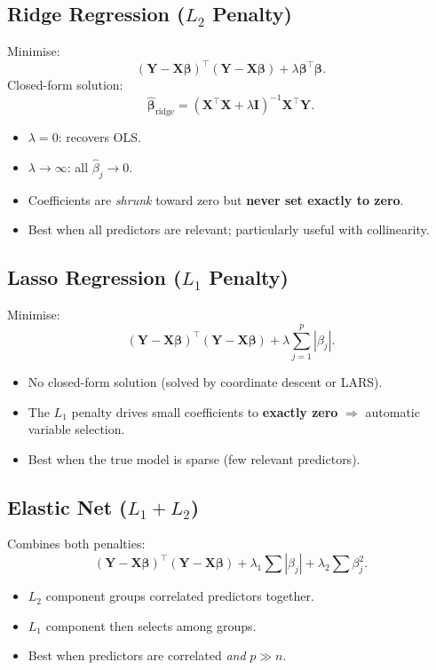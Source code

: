 \documentclass[12pt, a4paper]{article}
\begin{document}
\subsection{Ridge Regression ($L_2$ Penalty)}

Minimise:
\[
  (\mathbf{Y} - \mathbf{X}\boldsymbol{\beta})^\top(\mathbf{Y} - \mathbf{X}\boldsymbol{\beta}) + \lambda\boldsymbol{\beta}^\top\boldsymbol{\beta}.
\]
Closed-form solution:
\[
  \hat{\boldsymbol{\beta}}_\text{ridge} = (\mathbf{X}^\top\mathbf{X} + \lambda\mathbf{I})^{-1}\mathbf{X}^\top\mathbf{Y}.
\]
\begin{itemize}
  \item $\lambda = 0$: recovers OLS.
  \item $\lambda \to \infty$: all $\hat{\beta}_j \to 0$.
  \item Coefficients are \emph{shrunk} toward zero but \textbf{never set exactly to zero}.
  \item Best when all predictors are relevant; particularly useful with collinearity.
\end{itemize}

\subsection{Lasso Regression ($L_1$ Penalty)}

Minimise:
\[
  (\mathbf{Y} - \mathbf{X}\boldsymbol{\beta})^\top(\mathbf{Y} - \mathbf{X}\boldsymbol{\beta}) + \lambda\sum_{j=1}^p|\beta_j|.
\]
\begin{itemize}
  \item No closed-form solution (solved by coordinate descent or LARS).
  \item The $L_1$ penalty drives small coefficients to \textbf{exactly zero} $\Rightarrow$ automatic variable selection.
  \item Best when the true model is sparse (few relevant predictors).
\end{itemize}

\subsection{Elastic Net ($L_1 + L_2$)}

Combines both penalties:
\[
  (\mathbf{Y} - \mathbf{X}\boldsymbol{\beta})^\top(\mathbf{Y} - \mathbf{X}\boldsymbol{\beta}) + \lambda_1\sum|\beta_j| + \lambda_2\sum\beta_j^2.
\]
\begin{itemize}
  \item $L_2$ component groups correlated predictors together.
  \item $L_1$ component then selects among groups.
  \item Best when predictors are correlated \emph{and} $p \gg n$.
\end{itemize}
\end{document}
